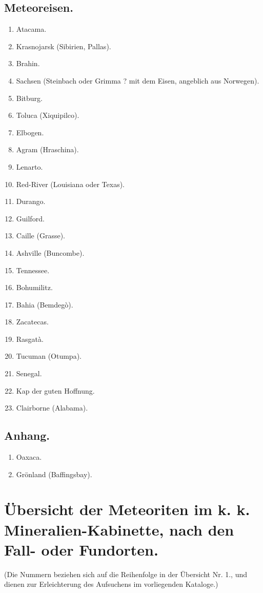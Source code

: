 \documentclass[a4paper, 11pt, oneside, polutonikogreek, german]{article}
\begin{document}
\subsection{Meteoreisen.}
\begin{enumerate}
    \small
    \item Atacama.
    \item Krasnojarsk (Sibirien, Pallas).
    \item Brahin.
    \item Sachsen (Steinbach oder Grimma ? mit dem Eisen, angeblich aus Norwegen).
    \item Bitburg.
    \item Toluca (Xiquipilco).
    \item Elbogen.
    \item Agram (Hraschina).
    \item Lenarto.
    \item Red-River (Louisiana oder Texas).
    \item Durango.
    \item Guilford.
    \item Caille (Grasse).
    \item Ashville (Buncombe).
    \item Tennessee.
    \item Bohumilitz.
    \item Bahia (Bemdegò).
    \item Zacatecas.
    \item Rasgatà.
    \item Tucuman (Otumpa).
    \item Senegal.
    \item Kap der guten Hoffnung.
    \item Clairborne (Alabama).
\end{enumerate}
\subsection{Anhang.}
\begin{enumerate}
    \small
    \item Oaxaca.
    \item Grönland (Baffingsbay).
\end{enumerate}
\clearpage
\section{Übersicht der Meteoriten im k. k. Mineralien-Kabinette, nach den Fall- oder Fundorten.}
\begin{center}
\small
(Die Nummern beziehen sich auf die Reihenfolge in der Übersicht Nr. 1., und dienen zur Erleichterung des Aufsuchens im vorliegenden Kataloge.)
\end{center}
\end{document}
